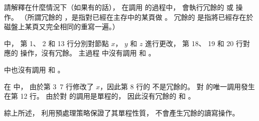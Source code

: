 \startEXERCISE
請解釋在什麼情況下（如果有的話），
在調用  的過程中，
會執行冗餘的  或  操作。
（所謂冗餘的 ，是指對已經在主存中的某頁做 。
冗餘的  是指將已經存在於磁盤上某頁又完全相同的重寫一遍。）
\stopEXERCISE

\startANSWER
{} 中，
第 1、 2 和 13 行分別對節點 $x$， $y$ 和 $z$ 進行更改，
第 18、 19 和 20 行對應的  操作，沒有冗餘。
主過程  中沒有調用  和 。

 中也沒有調用  和 。

在  中，
由於第 3~7 行修改了 $x$，因此第 8 行的  不是冗餘的。
對  的唯一調用發生在第 12 行。
由於對  的調用是單程的，
因此沒有冗餘的  和 。

綜上所述，  利用預處理策略保證了其單程性質，
不會產生冗餘的讀寫操作。
\stopANSWER
